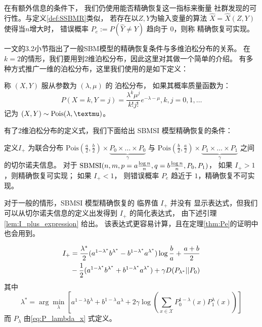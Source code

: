  在有额外信息的条件下，
 我们仍使用能否精确恢复这一指标来衡量
 社群发现的可行性。与定义\ref{def:SSBMR}类似，
 若存在以$Z,Y$为输入变量的算法 $\hat{X}=\hat{X}(Z,Y)$
 使得当$n$增大时，
 错误概率
 $P_e:=P(\hat{Y} \neq Y)$ 趋向于 $0$，则称
 精确恢复可实现。

 \citet{abbe2015community}一文的3.2小节指出了一般SBM模型的精确恢复条件与多维泊松分布的关系。
在$k=2$的情形，我们要用到2维泊松分布，因此这里对其做一个简单的介绍。
有多种方式推广一维的泊松分布，这里我们使用的是如下定义：

\begin{definition}
    称 $(X,Y)$ 服从参数为 $(\lambda, \mu)$ 的 泊松分布，
    如果其概率质量函数为：
    \begin{equation}
        P(X=k, Y=j) = \frac{\lambda^k \mu^j}{k! j!}
        e^{-\lambda - \mu}, k,j=0,1,\dots
    \end{equation}
    记为 $(X,Y) \sim \Pois(\lambda, \mu)$。
\end{definition}

有了2维泊松分布的定义式，我们下面给出
SBMSI 模型精确恢复的条件：
\begin{theorem}\label{thm:Pe}
    定义$I_+$ 为联合分布 $\textrm{Pois}(\frac{a}{2},\frac{b}{2})\times \underbrace{P_0 \times \dots \times P_0}_{\gamma}$
    与 $\textrm{Pois}(\frac{b}{2}, \frac{a}{2})\times \underbrace{P_1 \times \dots \times P_1}_{\gamma}$ 
    之间的切尔诺夫信息。    
    对于 $\operatorname{SBMSI}(n,m,p=a\frac{\log n}{n},q=b\frac{\log n}{n},P_0,P_1)$，
    如果 $I_+>1$，则精确恢复可实现；
    如果 $I_+ < 1$，
    则错误概率 $P_e$ 趋近于 $1$，精确恢复不可实现。
\end{theorem}
对于一般的情形，SBMSI 模型精确恢复的 临界值 $I_+$ 并没有
显示表达式，但我们可以从切尔诺夫信息的定义出发得到 $I_+$ 的简化表达式，
由下述引理 \ref{lem:I_plus_expression} 给出。
该表达式更容易计算，且在定理\ref{thm:Pe}的证明中也会用到。

\begin{lemma}\label{lem:I_plus_expression}
\begin{align}\label{equation:I+}
    I_+ &=\frac{\lambda^* }{2} (a^{1-\lambda^* }b^{\lambda^* } -
    b^{1-\lambda^* }a^{\lambda^* })\log\frac{b}{a}+\frac{a+b}{2}\notag \\
    &-\frac{1}{2}(a^{1-\lambda^*}b^{\lambda^*} +
    b^{1-\lambda^* }a^{\lambda^* })+\gamma D(P_{\lambda^* }||P_0) 
	\end{align}
	其中
	\begin{equation}\label{eq:lambda}
    \lambda^* = \arg\min_{\lambda} \left[a^{1-\lambda}b^{\lambda} +
    b^{1-\lambda}a^{\lambda} + 2\gamma \log
    \left(\sum_{x\in \mathcal{X}}P^{1-\lambda}_0(x) P^{\lambda}_1(x)
    \right)
    \right]
\end{equation}
而 $P_{\lambda}$ 由\eqref{eq:P_lambda_x} 式定义。
\end{lemma}



